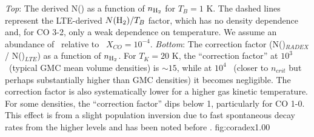 {{\it Top}: The derived N(\hh) as a function of $n_{\textrm{H}_{2}}$ for $T_{B}=1$ K.
The dashed lines represent the LTE-derived $N(\textrm{H}_{2})/T_B$ factor, which has 
no density dependence and, for CO 3-2, only a weak dependence on temperature.
We assume an abundance of \twelveco\ relative to \hh\ $X_{CO} = 10^{-4}$.
{\it Bottom}: The correction factor (N(\hh)$_{RADEX}$ / N(\hh)$_{LTE}$) as
a function of $n_{\textrm{H}_{2}}$.
For $T_K=20$ K, the ``correction factor'' at $10^3$ \percc\ (typical GMC
mean volume densities) is $\sim15$, while at $10^4$ \percc\ (closer to $n_{crit}$ but
perhaps substantially higher than GMC densities) it becomes negligible.  The
correction factor is also systematically lower for a higher gas kinetic
temperature.
For some densities, the ``correction factor'' dips below 1, particularly for CO
1-0.  This effect is from a slight population inversion due to fast spontaneous
decay rates from the higher levels and has been noted before
\citep[e.g.][]{Goldsmith1972}.
}{fig:coradex}{1.0}{0}

%
